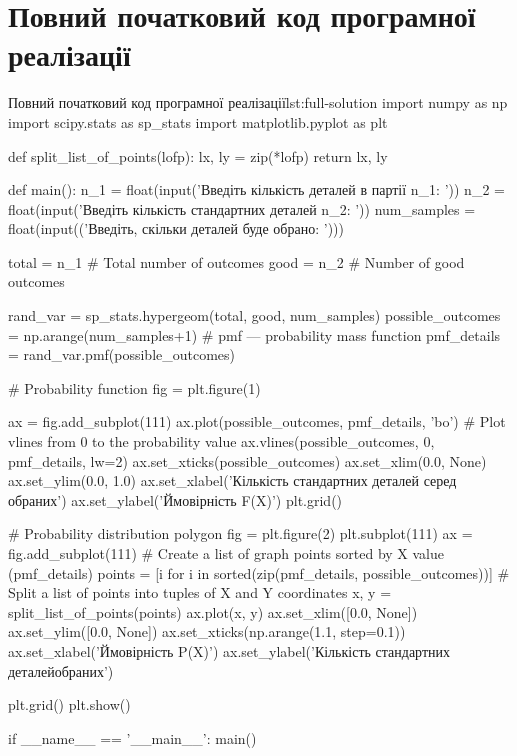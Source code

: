 \documentclass[
	a4paper,
	oneside,
	BCOR = 10mm,
	DIV = 12,
	12pt,
	headings = normal,
]{scrartcl}
\begin{document}
		\appendix
		\section{Повний початковий код програмної реалізації}
		\label{sec:full-listing}
			\begin{listingpython}[toprule = 0pt, bottomrule = 0pt]{Повний початковий код програмної реалізації}{lst:full-solution}
import numpy as np
import scipy.stats as sp_stats
import matplotlib.pyplot as plt


def split_list_of_points(lofp):
    lx, ly = zip(*lofp)
    return lx, ly


def main():
    n_1 = float(input('Введіть кількість деталей в партії n_1: '))
    n_2 = float(input('Введіть кількість стандартних деталей n_2: '))
    num_samples = float(input(('Введіть, скільки деталей буде обрано: ')))

    total = n_1  # Total number of outcomes
    good = n_2   # Number of good outcomes

    rand_var = sp_stats.hypergeom(total, good, num_samples)
    possible_outcomes = np.arange(num_samples+1)
    # pmf --- probability mass function
    pmf_details = rand_var.pmf(possible_outcomes)

    # Probability function
    fig = plt.figure(1)

    ax = fig.add_subplot(111)
    ax.plot(possible_outcomes, pmf_details, 'bo')
    # Plot vlines from 0 to the probability value
    ax.vlines(possible_outcomes, 0, pmf_details, lw=2)
    ax.set_xticks(possible_outcomes)
    ax.set_xlim(0.0, None)
    ax.set_ylim(0.0, 1.0)
    ax.set_xlabel('Кількість стандартних деталей серед обраних')
    ax.set_ylabel('Ймовірність F(X)')
    plt.grid()

    # Probability distribution polygon
    fig = plt.figure(2)
    plt.subplot(111)
    ax = fig.add_subplot(111)
    # Create a list of graph points sorted by X value (pmf_details)
    points = [i for i in sorted(zip(pmf_details, possible_outcomes))]
    # Split a list of points into tuples of X and Y coordinates
    x, y = split_list_of_points(points)
    ax.plot(x, y)
    ax.set_xlim([0.0, None])
    ax.set_ylim([0.0, None])
    ax.set_xticks(np.arange(1.1, step=0.1))
    ax.set_xlabel('Ймовірність P(X)')
    ax.set_ylabel('Кількість стандартних деталей обраних')

    plt.grid()
    plt.show()


if __name__ == '__main__':
    main()
			\end{listingpython}
\end{document}
